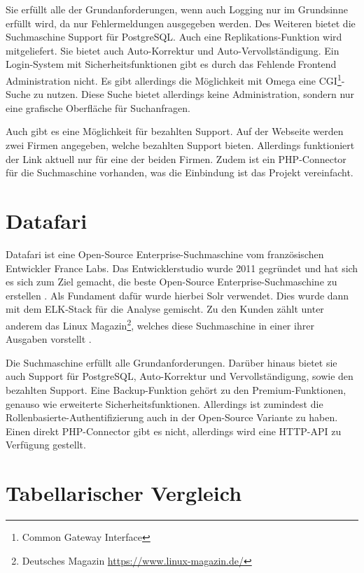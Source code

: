 Sie erfüllt alle der Grundanforderungen, wenn auch Logging nur im Grundsinne erfüllt wird, da nur Fehlermeldungen ausgegeben werden. Des Weiteren bietet die Suchmaschine Support für PostgreSQL. Auch eine Replikations-Funktion wird mitgeliefert. Sie bietet auch Auto-Korrektur und Auto-Vervollständigung. Ein Login-System mit Sicherheitsfunktionen gibt es durch das Fehlende Frontend Administration nicht. Es gibt allerdings die Möglichkeit mit Omega eine CGI\footnote{Common Gateway Interface}-Suche zu nutzen. Diese Suche bietet allerdings keine Administration, sondern nur eine grafische Oberfläche für Suchanfragen.

Auch gibt es eine Möglichkeit für bezahlten Support. Auf der Webseite werden zwei Firmen angegeben, welche bezahlten Support bieten. Allerdings funktioniert der Link aktuell nur für eine der beiden Firmen. Zudem ist ein PHP-Connector für die Suchmaschine vorhanden, was die Einbindung ist das Projekt vereinfacht. \cite{XAP.2019}

\section{Datafari}
\label{datafari}

Datafari ist eine Open-Source Enterprise-Suchmaschine vom französischen Entwickler France Labs. Das Entwicklerstudio wurde 2011 gegründet und hat sich es sich zum Ziel gemacht, die beste Open-Source Enterprise-Suchmaschine zu erstellen \cite{Labs.2019}. Als Fundament dafür wurde hierbei Solr verwendet. Dies wurde dann mit dem ELK-Stack für die Analyse gemischt. Zu den Kunden zählt unter anderem das Linux Magazin\footnote{Deutsches Magazin \url{https://www.linux-magazin.de/}}, welches diese Suchmaschine in einer ihrer Ausgaben vorstellt \cite{MichaelBrandenburg.2019}. 

Die Suchmaschine erfüllt alle Grundanforderungen. Darüber hinaus bietet sie auch Support für PostgreSQL, Auto-Korrektur und Vervollständigung, sowie den bezahlten Support. Eine Backup-Funktion gehört zu den Premium-Funktionen, genauso wie erweiterte Sicherheitsfunktionen. Allerdings ist zumindest die Rollenbasierte-Authentifizierung auch in der Open-Source Variante zu haben. Einen direkt PHP-Connector gibt es nicht, allerdings wird eine HTTP-API zu Verfügung gestellt. \cite{Labs.b}

\section{Tabellarischer Vergleich}


